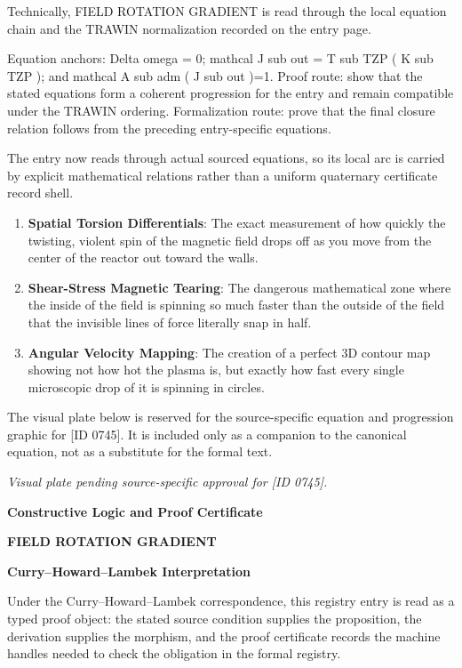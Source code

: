 Technically, FIELD ROTATION GRADIENT is read through the local equation chain and the TRAWIN normalization recorded on the entry page.

Equation anchors: Delta omega = 0; mathcal J sub out = T sub TZP ( K sub TZP ); and mathcal A sub adm ( J sub out )=1. Proof route: show that the stated equations form a coherent progression for the entry and remain compatible under the TRAWIN ordering. Formalization route: prove that the final closure relation follows from the preceding entry-specific equations.

The entry now reads through actual sourced equations, so its local arc is carried by explicit mathematical relations rather than a uniform quaternary certificate record shell.
\endgroup

\begin{enumerate}[leftmargin=1.6em,itemsep=6pt,topsep=4pt]
\item \textbf{Spatial Torsion Differentials}: The exact measurement of how quickly the twisting, violent spin of the magnetic field drops off as you move from the center of the reactor out toward the walls.
\item \textbf{Shear-Stress Magnetic Tearing}: The dangerous mathematical zone where the inside of the field is spinning so much faster than the outside of the field that the invisible lines of force literally snap in half.
\item \textbf{Angular Velocity Mapping}: The creation of a perfect 3D contour map showing not how hot the plasma is, but exactly how fast every single microscopic drop of it is spinning in circles.
\end{enumerate}

\begingroup\footnotesize\sloppy
The visual plate below is reserved for the source-specific equation and progression graphic for [ID 0745]. It is included only as a companion to the canonical equation, not as a substitute for the formal text.
\par\endgroup
\begingroup\footnotesize\itshape
Visual plate pending source-specific approval for [ID 0745].
\par\endgroup

\clearpage
\begingroup\tzpsupportsetup
\noindent\textbf{\fontsize{10.8pt}{12.8pt}\selectfont [ID 0745] Constructive Logic and Proof Certificate}\par
\noindent\textbf{\fontsize{10pt}{12pt}\selectfont FIELD ROTATION GRADIENT}\par
\vspace{0.45em}
\begingroup
\footnotesize
\setlength{\parskip}{0.22em}
\setlength{\parindent}{0pt}
\noindent\textbf{Curry--Howard--Lambek Interpretation}\par
Under the Curry--Howard--Lambek correspondence, this registry entry is read as a typed proof
object: the stated source condition supplies the proposition, the derivation supplies the
morphism, and the proof certificate records the machine handles needed to check the obligation
in the formal registry.

